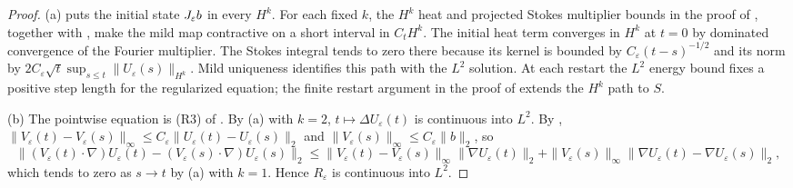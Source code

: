 \documentclass[11pt,letterpaper]{article}
\numberwithin{equation}{section}
\theoremstyle{plain}
\theoremstyle{definition}
\theoremstyle{remark}
\begin{document}
\begin{proof}
(a) \cite[Lemma~9.2]{CKNLean} puts the initial state
$J_\varepsilon b$ in every $H^k$. For each fixed $k$, the $H^k$ heat and
projected Stokes multiplier bounds in the proof of
\cite[Theorem~9.4]{CKNLean}, together with
\cite[(174)]{CKNLean}, make the mild map contractive on a short
interval in $C_tH^k$. The initial heat term converges in $H^k$ at
$t=0$ by dominated convergence of the Fourier multiplier. The Stokes
integral tends to zero there because its kernel is bounded by
$C_\varepsilon(t-s)^{-1/2}$ and its norm by
$2C_\varepsilon\sqrt t\sup_{s\le t}\|U_\varepsilon(s)\|_{H^k}$.
Mild uniqueness identifies this path with the $L^2$ solution. At each
restart the $L^2$ energy bound fixes a positive step length for the
regularized equation; the finite restart argument in the proof of
\cite[Theorem~9.4]{CKNLean} extends the $H^k$ path to $S$.

(b) The pointwise equation is (R3) of \cite[Theorem~9.4]{CKNLean}. By (a)
with $k=2$, $t\mapsto\Delta U_\varepsilon(t)$ is continuous into $L^2$. By
\cite[Lemma~9.2]{CKNLean},
$\|V_\varepsilon(t)-V_\varepsilon(s)\|_\infty\le C_\varepsilon
\|U_\varepsilon(t)-U_\varepsilon(s)\|_2$ and
$\|V_\varepsilon(s)\|_\infty\le C_\varepsilon\|b\|_2$, so
\[
\|(V_\varepsilon(t)\cdot\nabla)U_\varepsilon(t)
 -(V_\varepsilon(s)\cdot\nabla)U_\varepsilon(s)\|_2
\le\|V_\varepsilon(t)-V_\varepsilon(s)\|_\infty\|\nabla U_\varepsilon(t)\|_2
 +\|V_\varepsilon(s)\|_\infty\|\nabla U_\varepsilon(t)-\nabla U_\varepsilon(s)\|_2 ,
\]
which tends to zero as $s\to t$ by (a) with $k=1$. Hence $R_\varepsilon$ is
continuous into $L^2$.


\end{proof}
\end{document}
